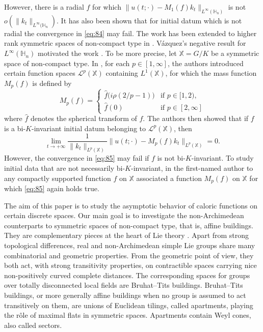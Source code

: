 \documentclass[11pt]{amsart}
\newcommand{\calL}{\mathcal{L}}
\theoremstyle{plain}
\theoremstyle{definition}
\numberwithin{equation}{section}
\begin{document}
However, there is a radial $f$ for which $\|u(t; \cdot) - M_1(f) k_t \|_{L^\infty(\mathbb{H}_n)}$ is not 
$o(\|k_t\|_{L^\infty(\mathbb{H}_n})$. It has also been shown that for initial datum which is not radial the convergence in
\eqref{eq:84} may fail. The work \cite{VazHyp} has been extended to higher rank symmetric spaces of non-compact type in 
\cite{APZ2023}. V\'azquez's negative result for $L^\infty(\mathbb{H}_n)$
motivated the work \cite{NRS24}. To be more precise, let $\mathbb{X} = G/K$ be a symmetric space of non-compact type. 
In \cite{NRS24}, for each $p \in [1, \infty]$, the authors introduced certain function spaces $\calL^p(\mathbb{X})$ 
containing $L^1(\mathbb{X})$, for which the mass function $M_p(f)$ is defined by
\[
	M_p(f) = 
	\begin{cases}
		\hat{f}\big(i\rho(2/p-1)\big) & \text{if } p \in [1, 2), \\
		\hat{f}(0) &\text{if } p \in [2, \infty]
	\end{cases}
\]
where $\hat{f}$ denotes the spherical transform of $f$. The authors then showed that if $f$ is a bi-$K$-invariant 
initial datum belonging to $\calL^p(\mathbb{X})$, then
\begin{equation}
	\label{eq:85}
	\lim_{t \to +\infty} \frac{1}{\|k_t\|_{L^p(\mathbb{X})}} \big\|u(t; \cdot) - M_p(f) k_t\big\|_{L^p(\mathbb{X})} = 0.
\end{equation}
However, the convergence in \eqref{eq:85} may fail if $f$ is not bi-$K$-invariant. To study initial data that are not
necessarily bi-$K$-invariant, in \cite{P1} the first-named author to any compactly supported function $f$ on $\mathbb{X}$ 
associated a function $M_p(f)$ on $\mathbb{X}$ for which \eqref{eq:85} again holds true.
	
The aim of this paper is to study the asymptotic behavior of caloric functions on certain discrete spaces. Our main goal
is to investigate the non-Archimedean counterparts to symmetric spaces of non-compact type, that is, affine buildings.
They are complementary pieces at the heart of Lie theory  \cite{Helgason1979, BruhatTits1972}. 
Apart from strong topological differences, real and non-Archimedean simple Lie groups share many combinatorial and geometric 
properties. From the geometric point of view, they both act, with strong transitivity properties, on contractible spaces 
carrying nice non-positively curved complete distances. The corresponding spaces for groups over totally disconnected local
fields are Bruhat--Tits buildings. Bruhat--Tits buildings, or more generally affine buildings when no group is assumed to 
act transitively on them, are unions of Euclidean tilings, called apartments, playing the r\^ole of maximal flats in 
symmetric spaces. Apartments contain Weyl cones, also called sectors.
\end{document}
